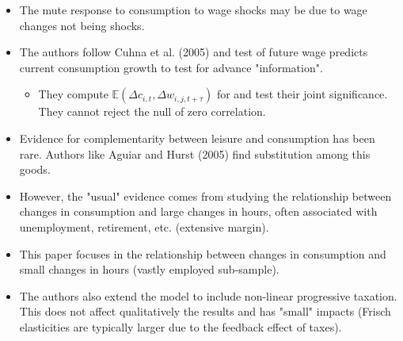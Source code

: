 \documentclass[notes=show]{beamer}
\begin{document}
\begin{frame}%


\begin{itemize}
\item The mute response to consumption to wage shocks may be due to wage
changes not being shocks.

\item The authors follow Cuhna et al. (2005) and test of future wage
predicts current consumption growth to test for advance "information".

\begin{itemize}
\item They compute $\mathbb{E}\left( \Delta c_{i,t},\Delta w_{i,j,t+\tau
}\right) $ for and test their joint significance. They cannot reject the
null of zero correlation.
\end{itemize}

\item Evidence for complementarity between leisure and consumption has been
rare. Authors like Aguiar and Hurst (2005) find substitution among this
goods.
\end{itemize}

\transboxout%
\end{frame}%

\bigskip

\begin{frame}%


\begin{itemize}
\item However, the "usual" evidence comes from studying the relationship
between changes in consumption and large changes in hours, often associated
with unemployment, retirement, etc. (extensive margin).

\item This paper focuses in the relationship between changes in consumption
and small changes in hours (vastly employed sub-sample).

\item The authors also extend the model to include non-linear progressive
taxation. This does not affect qualitatively the results and has "small"
impacts (Frisch elasticities are typically larger due to the feedback effect
of taxes).
\end{itemize}

\transboxout%
\end{frame}%
\end{document}
